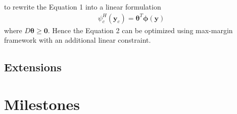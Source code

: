 \documentclass{article}
\begin{document}
		to rewrite the Equation 1 into a linear formulation
		\begin{align}
		\psi_c^H(\mathbf{y}_c)=\boldsymbol{\theta}^T\boldsymbol{\phi}(\mathbf{y})
		\end{align}
		where $ D\boldsymbol{\theta}\geq \mathbf{0}$. Hence the Equation 2 can be optimized using max-margin framework with an additional linear constraint.
		

	\subsection{Extensions}


	\section{Milestones}
	
	\renewcommand\refname{Bibliography}
	
	
\end{document}
